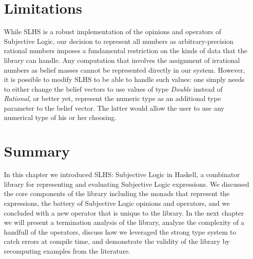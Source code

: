 \documentclass[thesis.tex]{subfiles}
\begin{document}
\section{Limitations}
\label{sec:limitations}

While SLHS is a robust implementation of the opinions and operators of Subjective Logic,
our decision to represent all numbers as arbitrary-precision rational numbers imposes a
fundamental restriction on the kinds of data that the library can handle. Any computation
that involves the assignment of irrational numbers as belief masses cannot be represented
directly in our system. However, it is possible to modify SLHS to be able to handle such
values: one simply needs to either change the belief vectors to use values of type
\emph{Double} instead of \emph{Rational}, or better yet, represent the numeric type as
an additional type parameter to the belief vector. The latter would allow the user to
use any numerical type of his or her choosing.




%
%



\section{Summary}

In this chapter we introduced SLHS: Subjective Logic in Haskell, a combinator library
for representing and evaluating Subjective Logic expressions. We discussed the core
components of the library including the monads that represent the expressions, the
battery of Subjective Logic opinions and operators, and we concluded with a new operator
that is unique to the library. In the next chapter we will present a termination
analysis of the library, analyze the complexity of a handfull of the operators, discuss
how we leveraged the strong type system to catch errors at compile time, and demonstrate
the validity of the library by recomputing examples from the literature.
\end{document}
